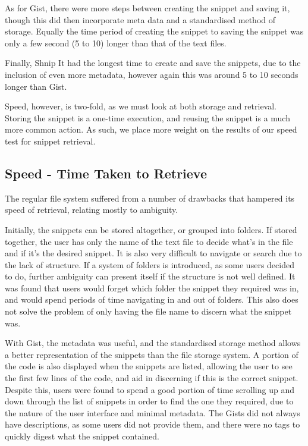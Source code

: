 As for Gist, there were more steps between creating the snippet and saving it, though this did then incorporate meta data and a standardised method of storage. 
Equally the time period of creating the snippet to saving the snippet was only a few second (5 to 10) longer than that of the text files.

Finally, Shnip It had the longest time to create and save the snippets, due to the inclusion of even more metadata, however again this was around 5 to 10 seconds longer than Gist.

Speed, however, is two-fold, as we must look at both storage and retrieval. 
Storing the snippet is a one-time execution, and reusing the snippet is a much more common action.
As such, we place more weight on the results of our speed test for snippet retrieval.

\subsection{Speed - Time Taken to Retrieve} \label{speedretrieve}
The regular file system suffered from a number of drawbacks that hampered its speed of retrieval, relating mostly to ambiguity.

Initially, the snippets can be stored altogether, or grouped into folders.
If stored together, the user has only the name of the text file to decide what's in the file and if it's the desired snippet.
It is also very difficult to navigate or search due to the lack of structure.
If a system of folders is introduced, as some users decided to do, further ambiguity can present itself if the structure is not well defined.
It was found that users would forget which folder the snippet they required was in, and would spend periods of time navigating in and out of folders. 
This also does not solve the problem of only having the file name to discern what the snippet was.

With Gist, the metadata was useful, and the standardised storage method allows a better representation of the snippets than the file storage system. 
A portion of the code is also displayed when the snippets are listed, allowing the user to see the first few lines of the code, and aid in discerning if this is the correct snippet.
Despite this, users were found to spend a good portion of time scrolling up and down through the list of snippets in order to find the one they required, due to the nature of the user interface and minimal metadata. 
The Gists did not always have descriptions, as some users did not provide them, and there were no tags to quickly digest what the snippet contained.


